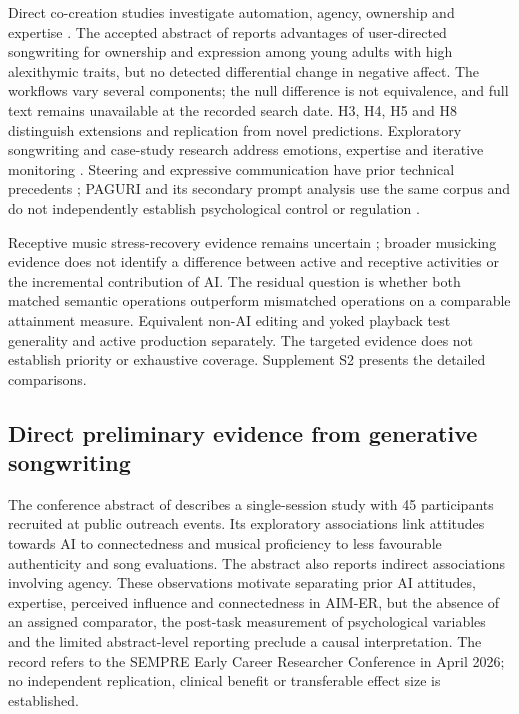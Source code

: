 \documentclass[11pt,a4paper]{article}
\begin{document}
Direct co-creation studies investigate automation, agency, ownership and expertise \citep{he2026}. The accepted abstract of \citet{zhang2026} reports advantages of user-directed songwriting for ownership and expression among young adults with high alexithymic traits, but no detected differential change in negative affect. The workflows vary several components; the null difference is not equivalence, and full text remains unavailable at the recorded search date. H3, H4, H5 and H8 distinguish extensions and replication from novel predictions. Exploratory songwriting and case-study research address emotions, expertise and iterative monitoring \citep{swarbrick2026,zhangliu2026}. Steering and expressive communication have prior technical precedents \citep{louie2020,louie2022}; PAGURI and its secondary prompt analysis use the same corpus and do not independently establish psychological control or regulation \citep{ronchini2025,zhangpan2026}.

Receptive music stress-recovery evidence remains uncertain \citep{adiasto2022}; broader musicking evidence \citep{peters2024} does not identify a difference between active and receptive activities or the incremental contribution of AI. The residual question is whether both matched semantic operations outperform mismatched operations on a comparable attainment measure. Equivalent non-AI editing and yoked playback test generality and active production separately. The targeted evidence does not establish priority or exhaustive coverage. Supplement S2 presents the detailed comparisons.

\subsection{Direct preliminary evidence from generative songwriting}
The conference abstract of \citet{swarbrick2026} describes a single-session study with 45 participants recruited at public outreach events. Its exploratory associations link attitudes towards AI to connectedness and musical proficiency to less favourable authenticity and song evaluations. The abstract also reports indirect associations involving agency. These observations motivate separating prior AI attitudes, expertise, perceived influence and connectedness in AIM-ER, but the absence of an assigned comparator, the post-task measurement of psychological variables and the limited abstract-level reporting preclude a causal interpretation. The record refers to the SEMPRE Early Career Researcher Conference in April 2026; no independent replication, clinical benefit or transferable effect size is established.
\end{document}
